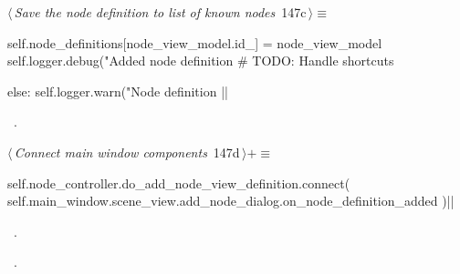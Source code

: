\documentclass[%
    a4paper,    %
    justified,  %
    nobib,      %
    openany     %
]{tufte-book}
\begin{document}
%
\begin{flushleft} \small
\begin{minipage}{\linewidth}\label{scrap164}\raggedright\small
{} $\langle\,${\itshape Save the node definition to list of known nodes}\nobreak\ {\footnotesize {147c}}$\,\rangle\equiv$
\vspace{-1ex}
\begin{pythoncode}
    self.node_definitions[node_view_model.id_] = node_view_model
    self.logger.debug("Added node definition %
    # TODO: Handle shortcuts

else:
    self.logger.warn("Node definition %
|\NWsep|
\end{pythoncode}
\vspace{1.5ex}
\footnotesize
\begin{list}{}{\setlength{\itemsep}{-\parsep}\setlength{\itemindent}{-\leftmargin}}
\item \NWtxtMacroRefIn\ .

\item{}
\end{list}
\end{minipage}\vspace{4ex}
\end{flushleft}
%
\begin{flushleft} \small
\begin{minipage}{\linewidth}\label{scrap165}\raggedright\small
{} $\langle\,${\itshape Connect main window components}\nobreak\ {\footnotesize {147d}}$\,\rangle+\equiv$
\vspace{-1ex}
\begin{pythoncode}
self.node_controller.do_add_node_view_definition.connect(
    self.main_window.scene_view.add_node_dialog.on_node_definition_added
    )|\NWsep|
\end{pythoncode}
\vspace{1.5ex}
\footnotesize
\begin{list}{}{\setlength{\itemsep}{-\parsep}\setlength{\itemindent}{-\leftmargin}}
\item \NWtxtMacroDefBy\ .
\item \NWtxtMacroRefIn\ .

\item{}
\end{list}
\end{minipage}\vspace{4ex}
\end{flushleft}
\end{document}
